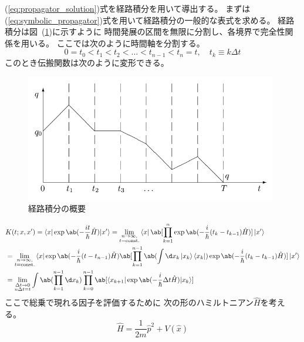 (\ref{eq:propagator_solution})式を経路積分を用いて導出する。
まずは(\ref{eq:symbolic_propagator})式を用いて経路積分の一般的な表式を求める。
経路積分は図~(\ref{fig:path_integral})に示すように
時間発展の区間を無限に分割し、各境界で完全性関係を用いる。
ここでは次のように時間軸を分割する。
\begin{equation}
  0=t_0<t_1<t_2<\ldots<t_{n-1}<t_n=t,\quad
  t_k\equiv k\Delta t
\end{equation}
このとき伝搬関数は次のように変形できる。
\begin{figure}[tbp]
  \begin{center}
    \includegraphics[width=11cm]{img/path_integral.png}
    \caption{経路積分の概要~\cite{osborn2014aqft}}\label{fig:path_integral}
  \end{center}
\end{figure}
\begin{equation}
  \begin{split}
    &K(t;x,x')
    =\braket{x|\exp\ab(-\frac{it}{\hbar}\hat{H})|x'}
    =\lim_{\substack{n\to\infty,\\t=\text{const.}}}
    \bra{x}
    \ab[
      \prod_{k=1}^n\exp\ab(-\frac{i}{\hbar}(t_k-t_{k-1})\hat{H})]
    \ket{x'} \\
    &=\lim_{\substack{n\to\infty,\\t=\text{const.}}}
    \bra{x}\exp\ab(-\frac{i}{\hbar}(t-t_{n-1})\hat{H})
    \ab[
      \prod_{k=1}^{n-1}
      \ab(\int\d x_k \ket{x_k}\bra{x_k})
      \exp\ab(-\frac{i}{\hbar}(t_{k}-t_{k-1})\hat{H})
    ]
    \ket{x'} \\
    &=\lim_{\substack{\Delta t\to0\\n\Delta t=t}}
    \int\ab(\prod_{k=1}^{n-1}\d x_k)
    \prod_{k=0}^{n-1}
    \ab[
      \braket{x_{k+1}|\exp\ab(-\frac{i}{\hbar}\Delta t\hat{H})|x_k}
    ]
  \end{split}
\end{equation}
ここで総乗で現れる因子を評価するために
次の形のハミルトニアン$\hat{H}$を考える。
\begin{equation}
  \hat{H}=\frac{1}{2m}\hat{p}^2+V(\hat{x})
\end{equation}
